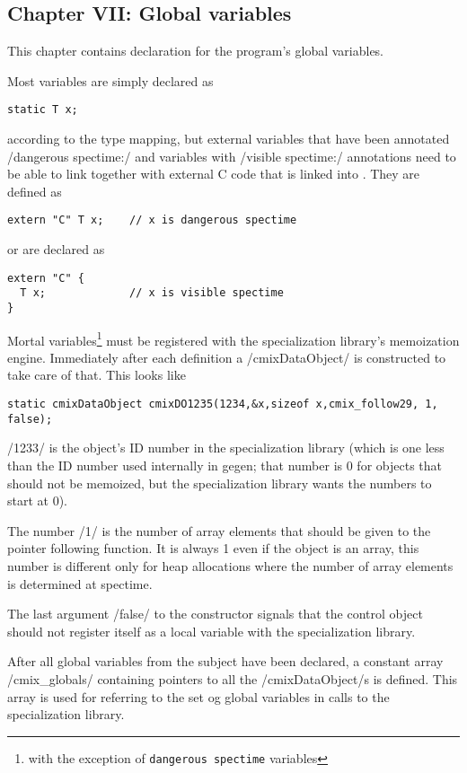 \begin{docpart}
\subsection{Chapter VII: Global variables}
This chapter contains declaration for the program's global variables.

Most variables are simply declared as
\begin{verbatim}
static T x;
\end{verbatim}
according to the type mapping,
but external variables that have been annotated /dangerous spectime:/ and
variables with /visible spectime:/ annotations need to be able to link
together with external C code that is linked into \Pgen. They are
defined as
\begin{verbatim}
extern "C" T x;    // x is dangerous spectime
\end{verbatim}
or
are declared as
\begin{verbatim}
extern "C" {
  T x;             // x is visible spectime
}
\end{verbatim}

Mortal variables\footnote{with the exception of \texttt{dangerous
spectime} variables} must be registered with the specialization
library's memoization engine. Immediately after each definition
a /cmixDataObject/ is constructed to take care of that. This looks
like
\begin{verbatim}
static cmixDataObject cmixDO1235(1234,&x,sizeof x,cmix_follow29, 1, false);
\end{verbatim}
/1233/ is the object's ID number in the specialization library (which is
one less than the ID number used internally in gegen; that number is
0 for objects that should not be memoized, but the specialization
library wants the numbers to start at 0).

The number /1/ is the number of array elements that should be given to
the pointer following function. It is always 1 even if the object is
an array, this number is different only for heap allocations where the
number of array elements is determined at spectime.

The last argument /false/ to the constructor signals that the control
object should not register itself as a local variable with the
specialization library.


After all global variables from the subject have been declared, a
constant array /cmix_globals/ containing pointers to all the
/cmixDataObject/s is defined. This array is used for referring to
the set og global variables in calls to the specialization library.


\end{docpart}
